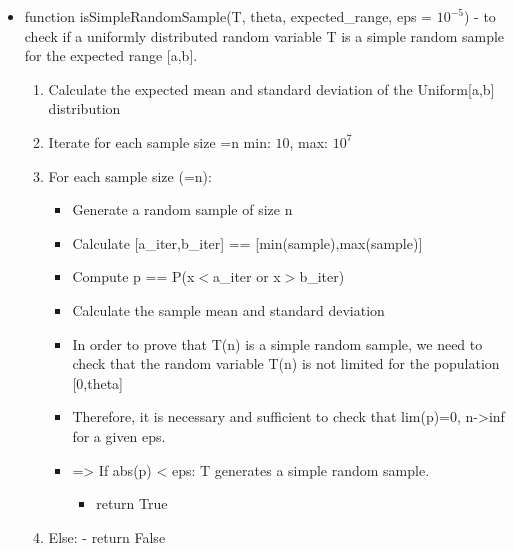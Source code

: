 \documentclass[11pt]{article}
\providecommand{\tightlist}{%
      \setlength{\itemsep}{0pt}\setlength{\parskip}{0pt}}
\def\gt{>}
\def\lt{<}
\begin{document}
\begin{itemize}
\tightlist
\item
  function isSimpleRandomSample(T, theta,
  expected\_range, eps = \(10^{-5}\)) - to check if a uniformly distributed
  random variable T is a simple random sample for the expected range
  {[}a,b{]}.

  \begin{enumerate}
  \def\labelenumi{\arabic{enumi}.}
  \tightlist
  \item
    Calculate the expected mean and standard deviation of the
    Uniform{[}a,b{]} distribution
  \item
    Iterate for each sample size =n min: \(10\), max: \(10^7\)
  \item

  For each sample size (=n):   
  \begin{itemize}
    \tightlist
    \item
    Generate a random sample of size n 
    \item
    Calculate {[}a\_iter,b\_iter{]} == {[}min(sample),max(sample){]} 
    \item
    Compute p == P(x\(\lt\)a\_iter or x\(\gt\)b\_iter) 
    \item
    Calculate the sample mean and standard deviation 
    \item
    In order to prove that T(n) is a simple random sample, we need to check that the random variable T(n) is not limited for the population {[}0,theta{]} 
    \item
    Therefore, it is necessary and sufficient to check that lim(p)=0, n-\textgreater inf for a given eps. 
    \item
    =\textgreater{} If abs(p) \textless{} eps: T generates a simple random sample.
    
    \begin{itemize}
    \tightlist
    \item
      return True
    \end{itemize}
    
  \end{itemize}
  \item
    Else: - return False
  \end{enumerate}
\end{itemize}
\end{document}
